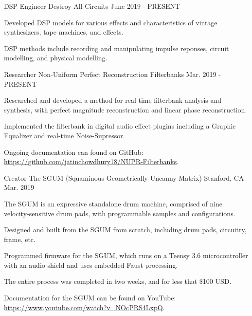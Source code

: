 \begin{cventries}
    \cventry
    {DSP Engineer} %
    {Destroy All Circuits} %
    {} %
    {June 2019 - PRESENT} %
    {
      \begin{cvitems} %
        \item {Developed DSP models for various effects and characteristics of vintage synthesizers, tape machines, and effects.}
        \item {DSP methods include recording and manipulating impulse reponses, circuit modelling, and physical modelling.}
      \end{cvitems}
    }

    \cventry
    {Researcher} %
    {Non-Uniform Perfect Reconstruction Filterbanks} %
    {} %
    {Mar. 2019 - PRESENT} %
    {
      \begin{cvitems} %
        \item {Researched and developed a method for real-time filterbank analysis and synthesis, with perfect magnitude reconstruction and linear phase reconstruction.}
        \item {Implemented the filterbank in digital audio effect plugins including a Graphic Equalizer and real-time Noise-Supressor.}
        \item {Ongoing documentation can found on GitHub: \url{https://github.com/jatinchowdhury18/NUPR-Filterbanks}.}
      \end{cvitems}
    }

    \cventry
    {Creator} %
    {The SGUM (Squaminous Geometrically Uncanny Matrix)} %
    {Stanford, CA} %
    {Mar. 2019} %
    {
      \begin{cvitems} %
        \item {The SGUM is an expressive standalone drum machine, comprised of nine velocity-sensitive drum pads, with programmable samples and configurations.}
        \item {Designed and built from the SGUM from scratch, including drum pads, circuitry, frame, etc.}
        \item {Programmed firmware for the SGUM, which runs on a Teensy 3.6 microcontroller with an audio shield and uses embedded Faust processing.}
        \item {The entire process was completed in two weeks, and for less that \$100 USD.}
        \item {Documentation for the SGUM can be found on YouTube: \url{https://www.youtube.com/watch?v=NOcPRS4LxpQ}.}
      \end{cvitems}
    }


\end{cventries}
